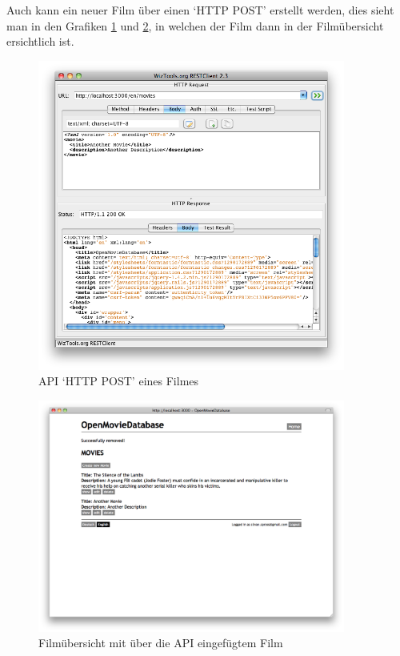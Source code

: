 \clearpage

Auch kann ein neuer Film über einen `HTTP POST' erstellt werden, dies sieht man
in den Grafiken \ref{test_schnittstelle_03} und \ref{test_schnittstelle_04},
in welchen der Film dann in der Filmübersicht ersichtlich ist.

\begin{figure}[ht]
    \begin{center}
        \includegraphics[width=0.9\textwidth,angle=0]{./bilder/tests/test_schnittstelle_03.png}
        \caption{API `HTTP POST' eines Filmes}
        \label{test_schnittstelle_03}
    \end{center}
\end{figure}

\begin{figure}[ht]
    \begin{center}
        \includegraphics[width=0.9\textwidth,angle=0]{./bilder/tests/test_schnittstelle_04.png}
        \caption{Filmübersicht mit über die API eingefügtem Film}
        \label{test_schnittstelle_04}
    \end{center}
\end{figure}

